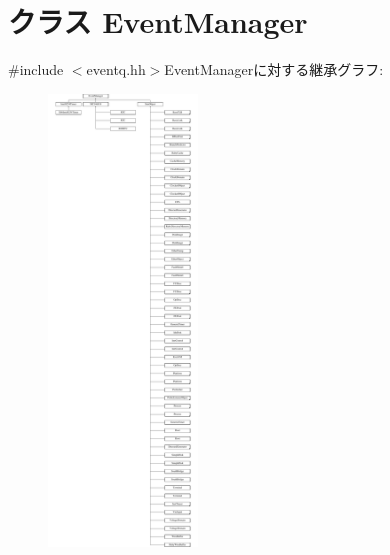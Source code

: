\hypertarget{classEventManager}{
\section{クラス EventManager}
\label{classEventManager}
}


{\ttfamily \#include $<$eventq.hh$>$}EventManagerに対する継承グラフ:\begin{figure}[H]
\begin{center}
\leavevmode
\includegraphics[height=12cm]{classEventManager}
\end{center}
\end{figure}
